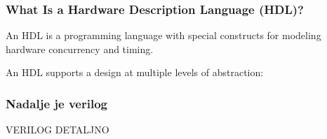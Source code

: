 \documentclass[t]{beamer}
\begin{document}
\begin{frame}
\frametitle{What Is a Hardware Description Language (HDL)?}

An HDL is a programming language with special constructs for modeling hardware concurrency and timing.

An HDL supports a design at multiple levels of abstraction:


\end{frame}


\begin{frame}
\frametitle{Nadalje je verilog}

VERILOG DETALJNO


\end{frame}
\end{document}

